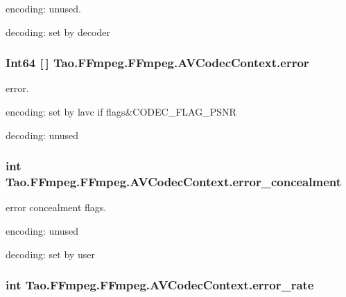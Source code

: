 \begin{DoxyItemize}
\item encoding: unused.
\item decoding: set by decoder 
\end{DoxyItemize}\hypertarget{struct_tao_1_1_f_fmpeg_1_1_f_fmpeg_1_1_a_v_codec_context_aa3fbda308154efa502df56f82d171a35}{
\subsubsection[{error}]{\setlength{\rightskip}{0pt plus 5cm}Int64 \mbox{[}$\,$\mbox{]} {\bf Tao.FFmpeg.FFmpeg.AVCodecContext.error}}}
\label{struct_tao_1_1_f_fmpeg_1_1_f_fmpeg_1_1_a_v_codec_context_aa3fbda308154efa502df56f82d171a35}
error.
\begin{DoxyItemize}
\item encoding: set by lavc if flags\&CODEC\_\-FLAG\_\-PSNR
\item decoding: unused 
\end{DoxyItemize}\hypertarget{struct_tao_1_1_f_fmpeg_1_1_f_fmpeg_1_1_a_v_codec_context_a5d439f7082720e2d24dcb5de48b881c4}{
\subsubsection[{error\_\-concealment}]{\setlength{\rightskip}{0pt plus 5cm}int {\bf Tao.FFmpeg.FFmpeg.AVCodecContext.error\_\-concealment}}}
\label{struct_tao_1_1_f_fmpeg_1_1_f_fmpeg_1_1_a_v_codec_context_a5d439f7082720e2d24dcb5de48b881c4}
error concealment flags.
\begin{DoxyItemize}
\item encoding: unused
\item decoding: set by user 
\end{DoxyItemize}\hypertarget{struct_tao_1_1_f_fmpeg_1_1_f_fmpeg_1_1_a_v_codec_context_a08aec2b15e9572f2fa0b3694540272e8}{
\subsubsection[{error\_\-rate}]{\setlength{\rightskip}{0pt plus 5cm}int {\bf Tao.FFmpeg.FFmpeg.AVCodecContext.error\_\-rate}}}
